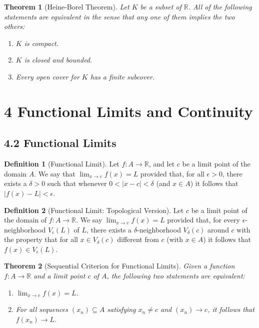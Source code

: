 \documentclass{amsart}
\newtheorem*{theorem}{Theorem}
\theoremstyle{definition}
\newtheorem*{definition}{Definition}
\newcommand{\R}{\mathbb{R}}
\newcommand{\abs}[1]{|#1|}
\begin{document}
\begin{theorem}[Heine-Borel Theorem]
  Let $K$ be a subset of $\R$. All of the following statements are equivalent in
  the sense that any one of them implies the two others:
  \begin{enumerate}[label={(\roman*)}]
    \item $K$ is compact.
    \item $K$ is closed and bounded.
    \item Every open cover for $K$ has a finite subcover.
  \end{enumerate}
\end{theorem}

\section*{4 Functional Limits and Continuity}

\subsection*{4.2 Functional Limits}

\begin{definition}[Functional Limit]
  Let $f : A \to \R$, and let $c$ be a limit point of the domain $A$. We say
  that $\lim_{x \to c} f(x) = L$ provided that, for all $\epsilon > 0$, there
  exists a $\delta > 0$ such that whenever $0 < \abs{x - c} < \delta$ (and $x
  \in A$) it follows that $\abs{f(x) - L} < \epsilon$.
\end{definition}

\begin{definition}[Functional Limit: Topological Version]
  Let $c$ be a limit point of the domain of $f : A \to \R$. We say $\lim_{x \to
  c} f(x) = L$ provided that, for every $\epsilon$-neighborhood $V_\epsilon(L)$
  of $L$, there exists a $\delta$-neighborhood $V_\delta(c)$ around $c$ with
  the property that for all $x \in V_\delta(c)$ different from $c$ (with $x \in
  A$) it follows that $f(x) \in V_\epsilon(L)$.
\end{definition}

\begin{theorem}[Sequential Criterion for Functional Limits]
  Given a function $f : A \to \R$ and a limit point $c$ of $A$, the following
  two statements are equivalent:
  \begin{enumerate}[label={(\roman*)}]
    \item $\lim_{x \to c} f(x) = L$.
    \item For all sequences $(x_n) \subseteq A$ satisfying $x_n \neq c$ and
      $(x_n) \to c$, it follows that $f(x_n) \to L$.
  \end{enumerate}
\end{theorem}
\end{document}
